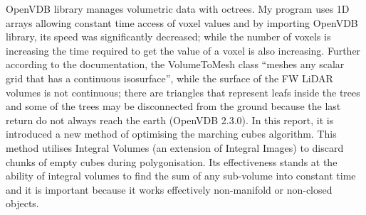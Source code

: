 \documentclass{subfiles}
\begin{document}
OpenVDB library manages volumetric data with octrees. My program uses 1D arrays allowing constant time access of voxel values and by importing OpenVDB library, its speed was significantly decreased; while the number of voxels is increasing the time required to get the value of a voxel is also increasing. Further according to the documentation, the VolumeToMesh class “meshes any scalar grid that has a continuous isosurface”, while the surface of the FW LiDAR volumes is not continuous; there are triangles that represent leafs inside the trees and some of the trees may be disconnected from the ground because the last return do not always reach the earth  (OpenVDB 2.3.0). \newline\newline
In this report, it is introduced a new method of optimising the marching cubes algorithm. This method utilises Integral Volumes (an extension of Integral Images) to discard chunks of empty cubes during polygonisation. Its effectiveness stands at the ability of integral volumes to find the sum of any sub-volume into constant time and it is important because it works effectively non-manifold or non-closed objects. \newline\newline
\end{document}
